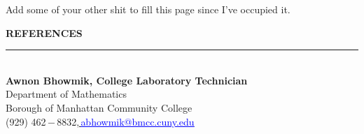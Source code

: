 \documentclass[a4paper, 12pt]{article}
\begin{document}
    Add some of your other shit to fill this page since I've occupied it.
    \begin{flushleft}
        \textbf{REFERENCES}\\\noindent\rule{\textwidth}{1pt}\\\textbf{Awnon Bhowmik, College Laboratory Technician}\\Department of Mathematics\\Borough of Manhattan Community College\\(929) 462\,$-$\,8832,\href{mailto: abhowmik@bmcc.cuny.edu}{\textcolor{blue}{\,\underline{abhowmik@bmcc.cuny.edu}}}
    \end{flushleft}
\end{document}
